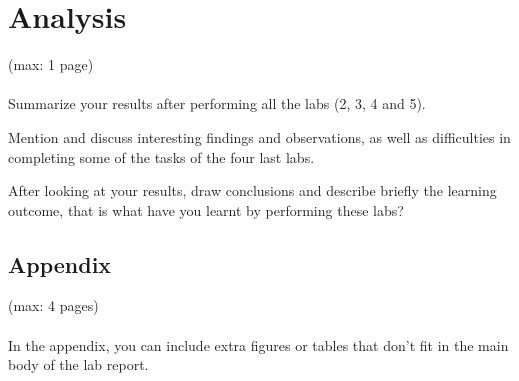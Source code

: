 \documentclass[a4paper,11pt]{article}
\begin{document}
\section{Analysis}
(max: 1 page)
\\\\
Summarize your results after performing all the labs (2, 3, 4 and 5).

Mention and discuss interesting findings and observations, as well as difficulties in completing some of the tasks of the four last labs.

After looking at your results, draw conclusions and describe briefly the learning outcome, that is what have you learnt by performing these labs?  

\newpage
\begin{appendix}

\section{Appendix}
(max: 4 pages)
\\\\
In the appendix, you can include extra figures or tables that don't fit in the main body of the lab report. 

\end{appendix}
\end{document}
